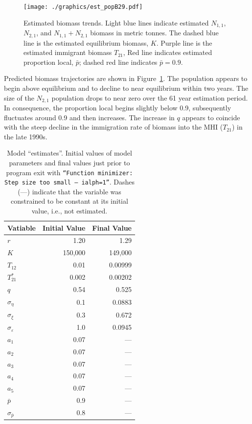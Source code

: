 \documentclass[12pt,letterpaper,twoside]{article}
\newcommand\None{{N_{1,1}}}
\newcommand\Ntwo{{N_{2,1}}}
\newcommand\Nsum{{N_{1,1}+N_{2,1}}}
\begin{document}
\begin{figure}[h!]
\begin{center}
\texttt{[image: ./graphics/est\_popB29.pdf]}
\caption{\label{fig:estB}
Estimated biomass trends.
Light blue lines indicate estimated $\None$, $\Ntwo$, and $\Nsum$
biomass in metric tonnes.
The dashed blue line is the estimated equilibrium biomass, $K$.
Purple line is the estimated immigrant biomass $T_{21}$, 
Red line indicates estimated proportion local, $\bar{p}$; 
dashed red line indicates $\bar{p}=0.9$. 
}
\end{center}
\end{figure}
Predicted biomass trajectories are shown in
Figure~\ref{fig:estB}. The population appears to begin above
equilibrium and to decline to near equilibrium within two years.
The size of the $\Ntwo$ population drops to near zero over the 61 year
estimation period.
In consequence, the proportion local begins slightly below 0.9,
subsequently fluctuates around 0.9 and then increases.
The increase in $q$ appears to coincide with the steep decline in the
immigration rate of biomass into the MHI ($T_{21}$) in the late 1990s.

\begin{table}
\caption{\label{tab:testrun}
Model ``estimates''. Initial values of model parameters and
final values just prior to program exit with 
{\tt ``Function minimizer: Step size  too small -- ialph=1''}. 
Dashes (---) indicate that the variable was constrained to be constant at
its initial value, i.e., not estimated.
}
\begin{center}
\begin{tabular}{lrr}
\hline
Vatiable & Initial Value & Final Value\\
\hline
\hline
$r$ & 1.20&  1.29\\
$K$ & 150,000 & 149,000 \\
$T_{12}$ & 0.01 & 0.00999\\
$T^*_{21}$& 0.002 & 0.00202\\
$q$ & 0.54 & 0.525\\
\hline
$\sigma_\eta$ & 0.1 & 0.0883\\
$\sigma_\xi$ & 0.3 & 0.672\\
$\sigma_\varepsilon$ & 1.0 & 0.0945\\
$a_1$ & 0.07 & ---\\
$a_2$ & 0.07 & ---\\
$a_3$ & 0.07 & ---\\
$a_4$ & 0.07 & ---\\
$a_5$ & 0.07 & ---\\
\hline
$\bar{p}$ & 0.9 & ---\\
$\sigma_{\bar{p}}$ & 0.8 & ---\\
\hline
\end{tabular}
\end{center}
\end{table}
\end{document}
